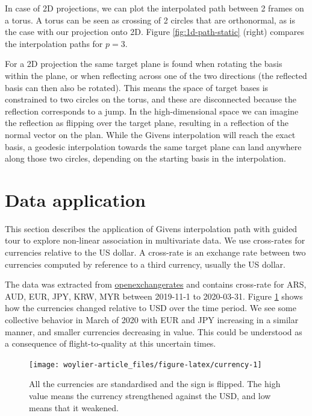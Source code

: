 In case of 2D projections, we can plot the interpolated path between 2 frames on a torus. A torus can be seen as crossing of 2 circles that are orthonormal, as is the case with our projection onto 2D. Figure \ref{fig:1d-path-static} (right) compares the interpolation paths for \(p=3\).

For a 2D projection the same target plane is found when rotating the basis within the plane, or when reflecting across one of the two directions (the reflected basis can then also be rotated). This means the space of target bases is constrained to two circles on the torus, and these are disconnected because the reflection corresponds to a jump. In the high-dimensional space we can imagine the reflection as flipping over the target plane, resulting in a reflection of the normal vector on the plan.
While the Givens interpolation will reach the exact basis, a geodesic interpolation towards the same target plane can land anywhere along those two circles, depending on the starting basis in the interpolation.

\hypertarget{data-application}{%
\section{Data application}\label{data-application}}

This section describes the application of Givens interpolation path with guided tour to explore non-linear association in multivariate data. We use cross-rates for currencies relative to the US dollar. A cross-rate is an exchange rate between two currencies computed by reference to a third currency, usually the US dollar.

The data was extracted from \href{https://openexchangerates.org}{openexchangerates} and contains cross-rate for ARS, AUD, EUR, JPY, KRW, MYR between 2019-11-1 to 2020-03-31. Figure \ref{fig:currency} shows how the currencies changed relative to USD over the time period. We see some collective behavior in March of 2020 with EUR and JPY increasing in a similar manner, and smaller currencies decreasing in value. This could be understood as a consequence of flight-to-quality at this uncertain times.

\begin{figure}
\texttt{[image: woylier-article\_files/figure-latex/currency-1]} \caption{All the currencies are standardised and the sign is flipped. The high value means the currency strengthened against the USD, and low means that it weakened.}\label{fig:currency}
\end{figure}

